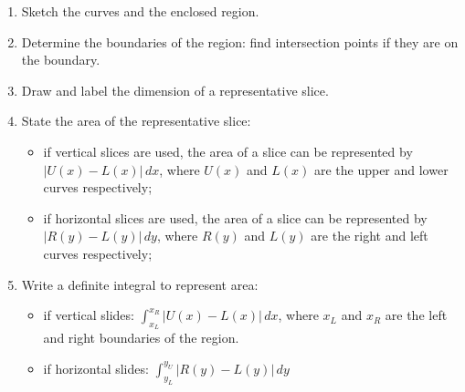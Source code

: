 \begin{enumerate}[sepno]
\item
  Sketch the curves and the enclosed region.
\item
  Determine the boundaries of the region: find intersection points if
  they are on the boundary.
\item
  Draw and label the dimension of a representative slice.
\item
  State the area of the representative slice:

  \begin{itemize}
  \item
    if vertical slices are used, the area of a slice can be represented
    by \(\lvert U(x)-L(x)\rvert\, dx\), where \(U(x)\) and \(L(x)\) are
    the upper and lower curves respectively;
  \item
    if horizontal slices are used, the area of a slice can be
    represented by \(\lvert R(y)-L(y)\rvert\, dy\), where \(R(y)\) and
    \(L(y)\) are the right and left curves respectively;
  \end{itemize}
\item
  Write a definite integral to represent area:

  \begin{itemize}
  \item
    if vertical slides:
    \(\displaystyle\int^{x_R}_{x_L}\lvert U(x)-L(x)\rvert\, dx\), where
    \(x_L\) and \(x_R\) are the left and right boundaries of the region.
  \item
    if horizontal slides:
    \(\displaystyle\int^{y_U}_{y_L}\lvert R(y)-L(y)\rvert\, dy\)
  \end{itemize}
\end{enumerate}




